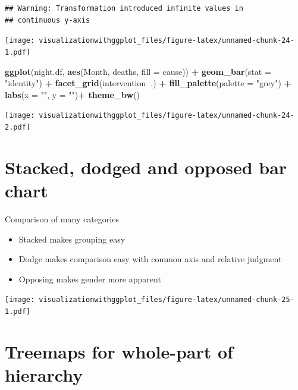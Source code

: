 \documentclass[]{krantz}
\makeatletter
\newenvironment{Shaded}{\begin{snugshade}}{\end{snugshade}}
\newcommand{\KeywordTok}[1]{\textcolor[rgb]{0.13,0.29,0.53}{\textbf{#1}}}
\newcommand{\DataTypeTok}[1]{\textcolor[rgb]{0.13,0.29,0.53}{#1}}
\newcommand{\StringTok}[1]{\textcolor[rgb]{0.31,0.60,0.02}{#1}}
\newcommand{\OperatorTok}[1]{\textcolor[rgb]{0.81,0.36,0.00}{\textbf{#1}}}
\newcommand{\NormalTok}[1]{#1}
\newenvironment{kframe}{%
\medskip{}
\setlength{\fboxsep}{.8em}
 \def\at@end@of@kframe{}%
 \ifinner\ifhmode%
  \def\at@end@of@kframe{\end{minipage}}%
  \begin{minipage}{\columnwidth}%
 \fi\fi%
 \def\FrameCommand##1{\hskip\@totalleftmargin \hskip-\fboxsep
 \colorbox{shadecolor}{##1}\hskip-\fboxsep
     \hskip-\linewidth \hskip-\@totalleftmargin \hskip\columnwidth}%
 \MakeFramed {\advance\hsize-\width
   \@totalleftmargin\z@ \linewidth\hsize
   \@setminipage}}%
 {\par\unskip\endMakeFramed%
 \at@end@of@kframe}
\renewenvironment{Shaded}{\begin{kframe}}{\end{kframe}}
\theoremstyle{definition}
\theoremstyle{definition}
\theoremstyle{definition}
\theoremstyle{remark}
\makeatother
\begin{document}
\begin{verbatim}
## Warning: Transformation introduced infinite values in
## continuous y-axis
\end{verbatim}

\texttt{[image: visualizationwithggplot\_files/figure-latex/unnamed-chunk-24-1.pdf]}

\begin{Shaded}
\begin{Highlighting}[]
\KeywordTok{ggplot}\NormalTok{(night.df, }\KeywordTok{aes}\NormalTok{(Month, deaths, }\DataTypeTok{fill =}\NormalTok{ cause)) }\OperatorTok{+}
\StringTok{  }\KeywordTok{geom_bar}\NormalTok{(}\DataTypeTok{stat =} \StringTok{"identity"}\NormalTok{) }\OperatorTok{+}
\StringTok{  }\KeywordTok{facet_grid}\NormalTok{(intervention}\OperatorTok{~}\NormalTok{.) }\OperatorTok{+}
\StringTok{   }\KeywordTok{fill_palette}\NormalTok{(}\DataTypeTok{palette =} \StringTok{"grey"}\NormalTok{) }\OperatorTok{+}
\StringTok{   }\KeywordTok{labs}\NormalTok{(}\DataTypeTok{x =} \StringTok{""}\NormalTok{, }\DataTypeTok{y =} \StringTok{""}\NormalTok{)}\OperatorTok{+}
\StringTok{  }\KeywordTok{theme_bw}\NormalTok{()}
\end{Highlighting}
\end{Shaded}

\texttt{[image: visualizationwithggplot\_files/figure-latex/unnamed-chunk-24-2.pdf]}

\section{Stacked, dodged and opposed bar
chart}\label{stacked-dodged-and-opposed-bar-chart}

Comparison of many categories

\begin{itemize}
\item
  Stacked makes grouping easy
\item
  Dodge makes comparison easy with common axis and relative judgment
\item
  Opposing makes gender more apparent
\end{itemize}

\texttt{[image: visualizationwithggplot\_files/figure-latex/unnamed-chunk-25-1.pdf]}

\section{Treemaps for whole-part of
hierarchy}\label{treemaps-for-whole-part-of-hierarchy}
\end{document}
